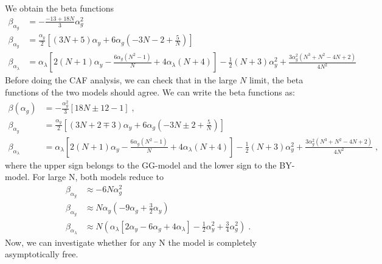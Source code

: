 We obtain the beta functions
\begin{align}
 \beta_{\alpha_g}&=-\frac{-13+18N}{3}\alpha_g^2\\
    \beta_{\alpha_y}&= \frac{\alpha_y}{2}\left[(3 N+5)\alpha_y+6 \alpha_g\left(-3 N-2+\frac 5N\right) \right]
   \\
   \beta_{\alpha_\lambda}&=\alpha_\lambda\left[2(N+1)\alpha_y-\frac{6 \alpha_g 
   \left(N^2-1\right)}{N}+4 \alpha_\lambda (N+4)\right]-\frac{1}{2} (N+3)
  \alpha_y^2+\frac{3 \alpha_g^2 \left(N^3+N^2-4 N+2\right)}{4 N^2} 
\end{align}
Before doing the CAF analysis, we can check that in the large $N$ limit, the beta functions of the two models should agree. We can write the beta functions as:
\begin{align}
    \beta(\alpha_g)&=-\frac{\alpha_g^2}{3}\left[18N\pm{12}-1\right]\;, \label{eq:GGBYp0betag}\\
    \beta_{\alpha_y}&= \frac{\alpha_y}{2}\left[(3 N+2\mp3)\alpha_y+6 \alpha_g\left(-3 N\pm2+\frac 5N\right) \right]
  \label{eq:GGBYp0betay} \\
   \beta_{\alpha_\lambda}&=\alpha_\lambda\left[2(N+1)\alpha_y-\frac{6 \alpha_g 
   \left(N^2-1\right)}{N}+4 \alpha_\lambda (N+4)\right]-\frac{1}{2} (N+3)
  \alpha_y^2+\frac{3 \alpha_g^2 \left(N^3+N^2-4 N+2\right)}{4 N^2} \;,\label{eq:GGBYp0betas}
\end{align}
where the upper sign belongs to the GG-model and the lower sign to the BY-model. For large N, both models reduce to
\begin{align}
    \beta_{\alpha_g}&\approx-6N\alpha_g^2\\
    \beta_{\alpha_y}&\approx N\alpha_y\left(-9\alpha_g+\frac{3}{2}\alpha_y\right)\\
    \beta_{\alpha_\lambda}&\approx N\left(\alpha_\lambda\left[2\alpha_y-6 \alpha_g 
   +4 \alpha_\lambda \right]-\frac{1}{2}
  \alpha_y^2+\frac{3}{4} \alpha_g^2 \right)\;.
\end{align}
Now, we can investigate whether for any N the model is completely asymptotically free. 
